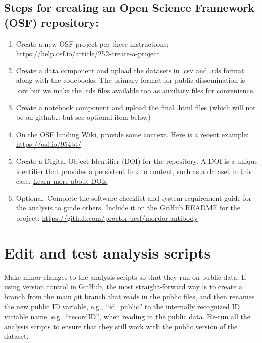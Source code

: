 \documentclass[
]{book}
\providecommand{\tightlist}{%
  \setlength{\itemsep}{0pt}\setlength{\parskip}{0pt}}
\begin{document}
\subsection{Steps for creating an Open Science Framework (OSF) repository:}\label{steps-for-creating-an-open-science-framework-osf-repository}

\begin{enumerate}
\def\labelenumi{\arabic{enumi}.}
\tightlist
\item
  Create a new OSF project per these instructions: \url{https://help.osf.io/article/252-create-a-project}
\item
  Create a data component and upload the datasets in .csv and .rds format along with the codebooks. The primary format for public dissemination is .csv but we make the .rds files available too as auxiliary files for convenience.
\item
  Create a notebook component and upload the final .html files (which will not be on github\ldots{} but see optional item below)
\item
  On the OSF landing Wiki, provide some context. Here is a recent example: \url{https://osf.io/954bt/}
\item
  Create a Digital Object Identifier (DOI) for the repository. A DOI is a unique identifier that provides a persistent link to content, such as a dataset in this case. \href{https://researchdata.princeton.edu/research-lifecycle-guide/whats-doi-and-what-should-i-know-about-citing-datasets}{Learn more about DOIs}
\item
  Optional: Complete the software checklist and system requirement guide for the analysis to guide others. Include it on the GitHub README for the project: \url{https://github.com/proctor-ucsf/mordor-antibody}
\end{enumerate}

\section{Edit and test analysis scripts}\label{edit-and-test-analysis-scripts}

Make minor changes to the analysis scripts so that they run on public data. If using version control in GitHub, the most straight-forward way is to create a branch from the main git branch that reads in the public files, and then renames the new public ID variable, e.g., ``id\_public'' to the internally recognized ID variable name, e.g.~``recordID'', when reading in the public data. Re-run all the analysis scripts to ensure that they still work with the public version of the dataset.
\end{document}
